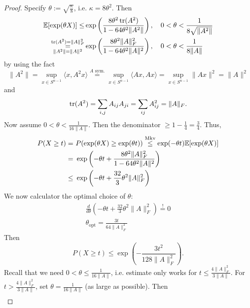 \begin{theorem}
\begin{proof}
Specify $\theta := \sqrt{\frac{\kappa}{8}}$, i.e. $\kappa = 8\theta^2$. Then
\begin{equation*}
\begin{split}
\mathbb{E} [\exp(\theta X) ] \leq & \exp\left( \frac{8\theta^2 \operatorname{tr}(A^2) }{1-64\theta^2 \|A^2\|} \right),	\quad 0<\theta< \frac{1}{8\sqrt{\|A^2\|}} \\
\underset{\|A^2\|=\|A\|^2}{\overset{\operatorname{tr}(A^2)=\|A\|_F^2}{=}} & 
\exp \left(
\frac{8\theta^2\|A\|_F^2}{1-64\theta^2\|A\|^2}
\right), \quad 0<\theta<\frac{1}{8\|A\|}
\end{split}
\end{equation*}
by using the fact
$$
\|A^2\|=\sup_{x\in S^{n-1}}\langle x,A^2 x\rangle \overset{A\text{ sym.}}{=} \sup_{x\in S^{n-1}} \langle Ax,Ax\rangle = \sup_{x\in S^{n-1}} \|Ax\|^2 = \|A\|^2
$$
and
$$
\operatorname{tr}(A^2) = \sum_{i,j} A_{ij} A_{ji} = \sum_{ij} A_{ij}^2 = \|A\|_F.
$$
Now assume $0<\theta<\frac{1}{16\|A\|}$. Then the denominator $\geq 1- \frac{1}{4} = \frac{3}{4}$. Thus,
\begin{equation*}
\begin{split}
P(X\geq t ) = \  & P (\exp(\theta X) \geq \exp (\theta t)) \overset{\text{Mkv}}\leq \exp(-\theta t) \mathbb{E}[\exp(\theta X)]	\\
 = \ &  
 \exp \left(
 -\theta t+\frac{8\theta^2 \|A\|_F^2}{1-64\theta^2\|A\|^2}
 \right)\\
 \leq \ & \exp\left(
 -\theta t+ \frac{32}{3}\theta^2\|A\|_F^2
 \right)
\end{split}
\end{equation*}
We now calculator the optimal choice of $\theta$:
\begin{equation*}
\begin{split}
\frac{d}{d\theta}\left(-\theta t + \frac{32}{3}\theta^2 \|A\|_F^2\right) \overset{!}=0\\
\theta_{\text{opt}} = \frac{3t}{64\|A\|_F^2}
\end{split}
\end{equation*}
Then
\begin{equation*}
P(X\geq t) \leq \exp\left(
- \frac{3t^2}{128\|A\|_F^2}
\right).
\end{equation*}
Recall that we need $0<\theta \leq \frac{1}{16\|A\|}$, i.e. estimate only works for $t \leq \frac{4\|A\|_F^2}{3\|A\|}$. For $t > \frac{4\|A\|_F^2}{3\|A\|}$, set $\theta=\frac{1}{16\|A\|}$ (as large as possible). Then
\begin{equation*}
\begin{split}

\end{split}
\end{equation*}
\end{proof}
\end{theorem}
